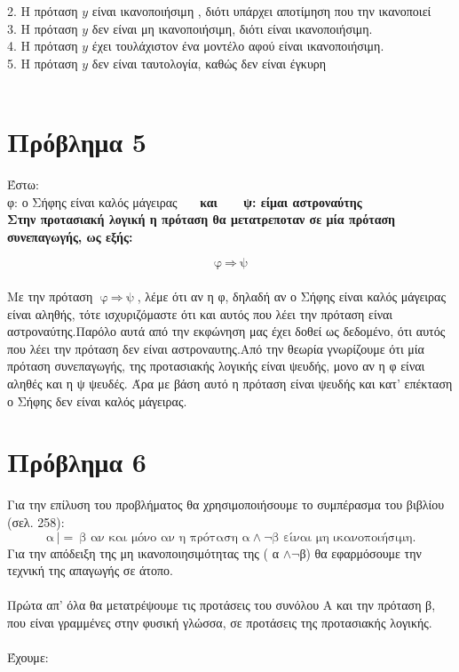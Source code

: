 \documentclass[10pt]{article}
\begin{document}
2. Η πρόταση $y$ είναι ικανοποιήσιμη , διότι υπάρχει αποτίμηση  που την ικανοποιεί\\

3. Η πρόταση $y$ δεν είναι μη ικανοποιήσιμη, διότι είναι ικανοποιήσιμη. \\

4. Η πρόταση $y$ έχει τουλάχιστον ένα μοντέλο αφού είναι ικανοποιήσιμη. \\

5. Η πρόταση $y$ δεν είναι ταυτολογία, καθώς δεν είναι έγκυρη
\\ \\

\section*{Πρόβλημα 5}

\vspace{5mm}

Έστω: \\

\hspace{20mm}φ: ο Σήφης είναι καλός μάγειρας \ \ \ \bf  και \normalfont \ \ \  ψ: είμαι αστροναύτης\\ 

Στην προτασιακή λογική η πρόταση θα μετατρεποταν σε μία πρόταση συνεπαγωγής, ως εξής:

\[ \text{φ} \ \Rightarrow \ \text{ψ} \] \\

Με την πρόταση  $\text{φ} \ \Rightarrow \ \text{ψ}$, λέμε ότι αν η φ, δηλαδή  αν ο Σήφης είναι καλός μάγειρας είναι αληθής, τότε ισχυριζόμαστε ότι και αυτός που λέει την πρόταση είναι αστροναύτης.Παρόλο αυτά από την εκφώνηση μας έχει δοθεί ως δεδομένο, ότι αυτός που λέει την πρόταση δεν είναι αστροναυτης.Από την θεωρία γνωρίζουμε ότι μία πρόταση συνεπαγωγής, της προτασιακής  λογικής  είναι ψευδής, μονο αν η φ είναι αληθές και η ψ ψευδές. Άρα με βάση αυτό η πρόταση είναι ψευδής και κατ’ επέκταση ο Σήφης δεν είναι καλός μάγειρας.


\section*{Πρόβλημα 6}

\vspace{5mm}

Για την επίλυση του προβλήματος θα χρησιμοποιήσουμε το συμπέρασμα του βιβλίου (σελ. 258):
\[
\text{α} \ |= ~\text{β αν και μόνο αν η πρόταση \ α} \wedge \neg \text{β \ είναι μη ικανοποιήσιμη.}
\]
Για την απόδειξη της μη ικανοποιησιμότητας της (  α $\wedge \neg $β) θα εφαρμόσουμε την τεχνική της απαγωγής σε άτοπο. \\ \\
Πρώτα απ’ όλα θα μετατρέψουμε τις προτάσεις του συνόλου Α και την πρόταση β, που είναι γραμμένες στην φυσική γλώσσα, σε προτάσεις της προτασιακής λογικής. \\ \\
Έχουμε: \\ 
\end{document}
